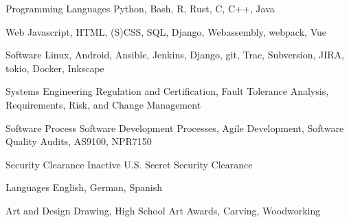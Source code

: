 


\begin{cvskills}


\cvskill
{Programming Languages} %
{Python, Bash, R, Rust, C, C++, Java} %


\cvskill
{Web} %
{Javascript, HTML, (S)CSS, SQL, Django, Webassembly, webpack, Vue} %


\cvskill
{Software} %
{Linux, Android, Ansible, Jenkins, Django, git, Trac, Subversion, JIRA, tokio, Docker, Inkscape} %


\cvskill
{Systems Engineering}
{Regulation and Certification, Fault Tolerance Analysis, Requirements, Risk, and Change Management}

\cvskill
{Software Process}
{Software Development Processes, Agile Development, Software Quality Audits, AS9100, NPR7150}


\cvskill
{Security Clearance}
{Inactive U.S. Secret Security Clearance}


\cvskill
{Languages} %
{English, German, Spanish} %



\cvskill
{Art and Design}
{Drawing, High School Art Awards, Carving, Woodworking}

\end{cvskills}

